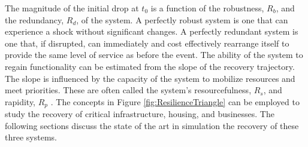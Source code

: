 \begin{partbacktext}
The magnitude of the initial drop at $t_0$ is a function of the robustness, $R_b$, and the redundancy, $R_d$, of the system. A perfectly robust system is one that can experience a shock without significant changes. A perfectly redundant system is one that, if disrupted, can immediately and cost effectively rearrange itself to provide the same level of service as before the event. The ability of the system to regain functionality can be estimated from the slope of the recovery trajectory. The slope is influenced by the capacity of the system to mobilize resources and meet priorities. These are often called the system's resourcefulness, $R_s$, and rapidity, $R_p$ \citep{Bruneau2003}. The concepts in Figure \ref{fig:ResilienceTriangle} can be employed to study the recovery of critical infrastructure, housing, and businesses. The following sections discuss the state of the art in simulation the recovery of these three systems.\

\FloatBarrier
\end{partbacktext}